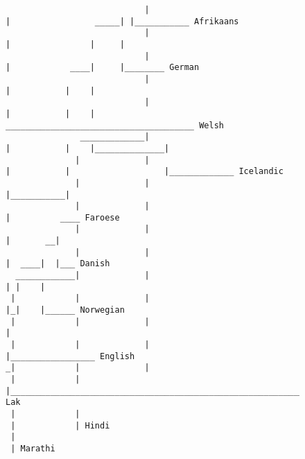 \begin{figure}[H]
\begin{center}
{\begin{verbatim}
                            |                                |                 _____| |___________ Afrikaans
                            |                                |                |     |
                            |                                |            ____|     |________ German
                            |                                |           |    |
                            |                                |           |    |               ______________________________________ Welsh
               _____________|                                |           |    |______________|
              |             |                                |           |                   |_____________ Icelandic
              |             |                                |___________|
              |             |                                            |          ____ Faroese
              |             |                                            |       __|
              |             |                                            |  ____|  |___ Danish
  ____________|             |                                            | |    |
 |            |             |                                            |_|    |______ Norwegian
 |            |             |                                              |
 |            |             |                                              |_________________ English
_|            |             |
 |            |             |_____________________________________________________________________ Lak
 |            |
 |            | Hindi
 |
 | Marathi



\end{verbatim}
}
\label{...}
\end{center}
\end{figure}
